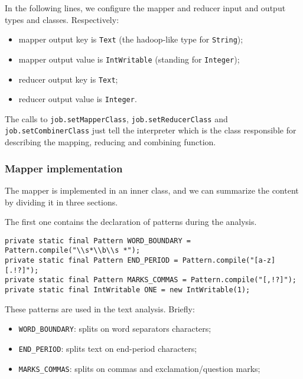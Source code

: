 \documentclass[a4paper,11pt, twoside]{article}
\begin{document}
		\bigskip
		\noindent
		In the following lines, we configure the mapper and reducer input and output types and classes.
		Respectively: \begin{itemize}
			\item mapper output key is \lstinline|Text| (the hadoop-like type for \lstinline|String|);
			\item mapper output value is \lstinline|IntWritable| (standing for \lstinline|Integer|);
			\item reducer output key is \lstinline|Text|;
			\item reducer output value is \lstinline|Integer|.
		\end{itemize}

		\noindent
		The calls to \lstinline|job.setMapperClass|, \lstinline|job.setReducerClass| and \lstinline|job.setCombinerClass| just tell the interpreter which is the class responsible for describing the mapping, reducing and combining function.
		
	\subsubsection{Mapper implementation} 
		
		The mapper is implemented in an inner class, and we can summarize the content by dividing it in three sections.

		\noindent
		The first one contains the declaration of patterns during the analysis.
	
	\begin{lstlisting}[firstnumber=73, caption={Declaration of Regular Expression Patterns}, captionpos=b]
private static final Pattern WORD_BOUNDARY = Pattern.compile("\\s*\\b\\s *");
private static final Pattern END_PERIOD = Pattern.compile("[a-z][.!?]");
private static final Pattern MARKS_COMMAS = Pattern.compile("[,!?]");
private static final IntWritable ONE = new IntWritable(1);
	\end{lstlisting}
	
		\noindent
		These patterns are used in the text analysis. Briefly: 
		\begin{itemize}
			\item \lstinline|WORD_BOUNDARY|: splits on word separators characters;
			\item \lstinline|END_PERIOD|: splits text on end-period characters;
			\item \lstinline|MARKS_COMMAS|: splits on commas and exclamation/question marks;
		\end{itemize}
\end{document}
